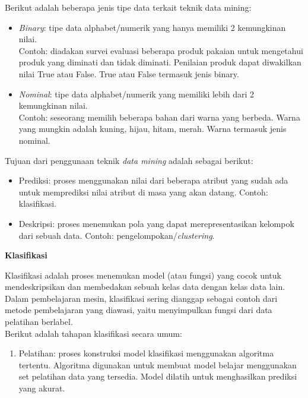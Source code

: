 \documentclass[a4paper,twoside]{article}
\begin{document}
\begin{enumerate}
\noindent Berikut adalah beberapa jenis tipe data terkait teknik data mining:

\begin{itemize}

\item \textit{Binary}: tipe data alphabet/numerik yang hanya memiliki 2 kemungkinan nilai.\\
Contoh: diadakan survei evaluasi beberapa produk pakaian untuk mengetahui produk yang diminati dan tidak diminati. Penilaian produk dapat diwakilkan nilai True atau False. True atau False termasuk jenis binary.

\item \textit{Nominal}: tipe data alphabet/numerik yang memiliki lebih dari 2 kemungkinan nilai.\\
Contoh: seseorang memilih beberapa bahan dari warna yang berbeda. Warna yang mungkin adalah kuning, hijau, hitam, merah. Warna termasuk jenis nominal.

\end{itemize}

\noindent Tujuan dari penggunaan teknik \textit{data mining} adalah sebagai berikut:

\begin{itemize}

\item Prediksi: proses menggunakan nilai dari beberapa atribut yang sudah ada untuk memprediksi nilai atribut di masa yang akan datang. Contoh: klasifikasi.

\item Deskripsi: proses menemukan pola yang dapat merepresentasikan kelompok dari sebuah data. Contoh: pengelompokan/\textit{clustering}.

\end{itemize}



\textbf{Klasifikasi}
			
Klasifikasi adalah proses menemukan model (atau fungsi) yang cocok untuk mendeskripsikan dan membedakan sebuah kelas data dengan kelas data lain. Dalam pembelajaran mesin, klasifikasi sering dianggap sebagai contoh dari metode pembelajaran yang diawasi, yaitu menyimpulkan fungsi dari data pelatihan berlabel.\\

\noindent Berikut adalah tahapan klasifikasi secara umum:
\begin{enumerate}

\item
Pelatihan: proses konstruksi model klasifikasi menggunakan algoritma tertentu. Algoritma digunakan untuk membuat model belajar menggunakan set pelatihan data yang tersedia. Model dilatih untuk menghasilkan prediksi yang akurat.


\end{enumerate}
\end{enumerate}
\end{document}
